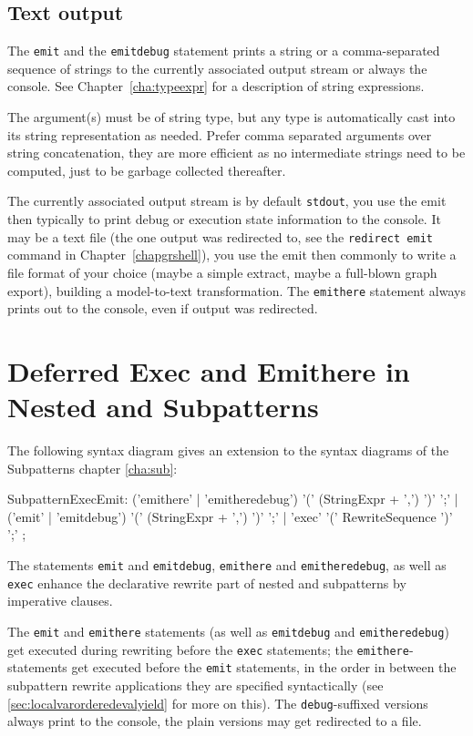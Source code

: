\subsection*{Text output}
The \texttt{emit} and the \texttt{emitdebug} statement prints a string or a comma-separated sequence of strings to the currently associated output stream or always the console. See Chapter~\ref{cha:typeexpr} for a description of string expressions.

The argument(s) must be of string type, but any type is automatically cast into its string representation as needed. Prefer comma separated arguments over string concatenation, they are more efficient as no intermediate strings need to be computed, just to be garbage collected thereafter.

The currently associated output stream is by default \texttt{stdout}, you use the emit then typically to print debug or execution state information to the console.
It may be a text file (the one output was redirected to, see the \texttt{redirect emit} command in Chapter~\ref{chapgrshell}), you use the emit then commonly to write a file format of your choice (maybe a simple extract, maybe a full-blown graph export), building a model-to-text transformation.
The \texttt{emithere} statement always prints out to the console, even if output was redirected.

\section{Deferred Exec and Emithere in Nested and Subpatterns}\label{sec:deferredexecemithere}

The following syntax diagram gives an extension to the syntax diagrams of the Subpatterns chapter \ref{cha:sub}:
\begin{rail}
  SubpatternExecEmit:
		('emithere' | 'emitheredebug') '(' (StringExpr + ',') ')' ';' |
		('emit' | 'emitdebug') '(' (StringExpr + ',') ')' ';' |
		'exec' '(' RewriteSequence ')' ';'
	;
\end{rail}

The statements \texttt{emit} and \texttt{emitdebug}, \texttt{emithere} and \texttt{emitheredebug}, as well as \texttt{exec} enhance the declarative rewrite part of nested and subpatterns by imperative clauses.

The \texttt{emit} and \texttt{emithere} statements (as well as \texttt{emitdebug} and \texttt{emitheredebug}) get executed during rewriting before the \texttt{exec} statements;
the \texttt{emithere}-statements get executed before the \texttt{emit} statements,
in the order in between the subpattern rewrite applications they are specified syntactically
(see \ref{sec:localvarorderedevalyield} for more on this).
The \texttt{debug}-suffixed versions always print to the console, the plain versions may get redirected to a file.

